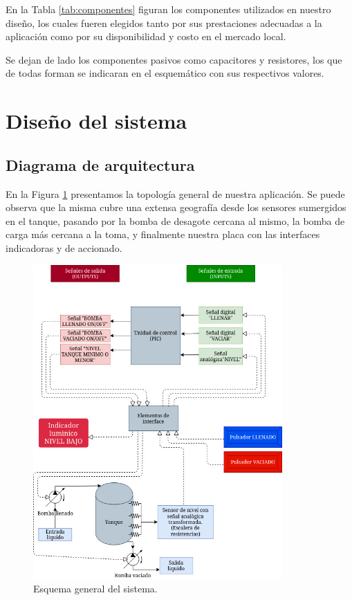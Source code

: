 \documentclass[a4paper]{article}
\begin{document}
En la Tabla \ref{tab:componentes} figuran los componentes 
utilizados en nuestro diseño, los cuales fueren elegidos tanto 
por sus prestaciones adecuadas a la aplicación como por su 
disponibilidad y costo en el mercado local.

Se dejan de lado los componentes pasivos como capacitores y 
resistores, los que de todas forman se indicaran en el esquemático
con sus respectivos valores.

\section{Diseño del sistema}

\subsection{Diagrama de arquitectura}

En la Figura \ref{fig:general} presentamos la topología 
general de nuestra aplicación. Se puede observa que 
la misma cubre una extensa geografía desde los sensores 
sumergidos en el tanque, pasando por la bomba de desagote
cercana al mismo, la bomba de carga más cercana a la toma,
y finalmente nuestra placa con las interfaces indicadoras 
y de accionado. 

\begin{figure}[h]\centering
    \includegraphics[height=12cm]{diagrama_sistema.jpg}
    \caption{Esquema general del sistema.}\label{fig:general}
\end{figure}
\end{document}

